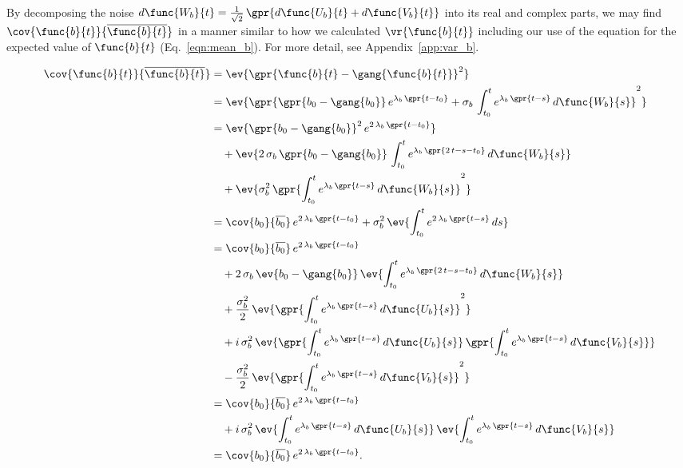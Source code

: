 By decomposing the noise $d\func{W_b}{t} = \frac{1}{\sqrt{2}}\,\gpr{d\func{U_b}{t} + d\func{V_b}{t}}$ into its real and complex parts, we may find $\cov{\func{b}{t}}{\overline{\func{b}{t}}}$ in a manner similar to how we calculated $\vr{\func{b}{t}}$ including our use of the equation for the expected value of $\func{b}{t}$ (Eq.~\ref{eqn:mean_b}). For more detail, see Appendix~\ref{app:var_b}.

\begin{align}
    \cov{\func{b}{t}}{\overline{\func{b}{t}}} &= \ev{\gpr{\func{b}{t} - \gang{\func{b}{t}}}^2} \nonumber \\
    	&= \ev{\gpr{\gpr{b_0 - \gang{b_0}}\,e^{\lambda_{b}\,\gpr{t - t_0}} + \sigma_b\,\int_{t_0}^{t} e^{\lambda_{b}\,\gpr{t - s}}\,d\func{W_{b}}{s}}^2} \nonumber \\
    	&= \ev{\gpr{b_0 - \gang{b_0}}^2\,e^{2\,\lambda_b\,\gpr{t - t_0}}} \nonumber \\
    		&\quad + \ev{2\,\sigma_b\,\gpr{b_0 - \gang{b_0}}\,\int_{t_0}^{t} e^{\lambda_b\,\gpr{2\,t - s - t_0}}\,d\func{W_b}{s}} \nonumber \\
    		&\quad + \ev{\sigma_b^2\,\gpr{\int_{t_0}^{t} e^{\lambda_b\,\gpr{t - s}}\,d\func{W_b}{s}}^2} \nonumber \\
    	&= \cov{b_0}{\overline{b_0}}\,e^{2\,\lambda_b\,\gpr{t - t_0}} + \sigma_b^2\,\ev{\int_{t_0}^{t} e^{2\,\lambda_b\,\gpr{t - s}}\,ds} \nonumber \\
    	&= \cov{b_0}{\overline{b_0}}\,e^{2\,\lambda_b\,\gpr{t - t_0}} \nonumber \\
    		&\quad + 2\,\sigma_b\,\ev{b_0 - \gang{b_0}}\,\ev{\int_{t_0}^{t} e^{\lambda_b\,\gpr{2\,t - s - t_0}}\,d\func{W_b}{s}} \nonumber \\
    		&\quad + \frac{\sigma_b^2}{2}\,\ev{\gpr{\int_{t_0}^{t} e^{\lambda_b\,\gpr{t - s}}\,d\func{U_b}{s}}^2} \nonumber \\
    		&\quad + i\,\sigma_b^2\,\ev{\gpr{\int_{t_0}^{t} e^{\lambda_b\,\gpr{t - s}}\,d\func{U_b}{s}}\,\gpr{\int_{t_0}^{t} e^{\lambda_b\,\gpr{t - s}}\,d\func{V_b}{s}}} \nonumber \\
    		&\quad - \frac{\sigma_b^2}{2}\,\ev{\gpr{\int_{t_0}^{t} e^{\lambda_b\,\gpr{t - s}}\,d\func{V_b}{s}}^2} \nonumber \\
    	&= \cov{b_0}{\overline{b_0}}\,e^{2\,\lambda_b\,\gpr{t - t_0}} \nonumber \\
    		&\quad + i\,\sigma_b^2\,\ev{\int_{t_0}^{t} e^{\lambda_b\,\gpr{t - s}}\,d\func{U_b}{s}}\,\ev{\int_{t_0}^{t} e^{\lambda_b\,\gpr{t - s}}\,d\func{V_b}{s}} \nonumber \\
    	&= \cov{b_0}{\overline{b_0}}\,e^{2\,\lambda_b\,\gpr{t - t_0}}. \label{eqn:cov_b_conjgb}
\end{align}